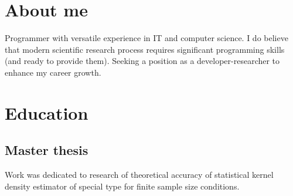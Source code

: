 \documentclass[12pt,a4paper,roman]{moderncv}
\begin{document}
\makecvtitle

\section{About me}
Programmer with versatile experience in IT and computer science.
I do believe that modern scientific research process requires significant programming skills (and ready to provide them).
Seeking a position as a developer-researcher to enhance my career growth.

\section{Education}

\subsection{Master thesis}
Work was dedicated to research of theoretical accuracy of statistical kernel density estimator of special type for finite sample size conditions.
\end{document}
